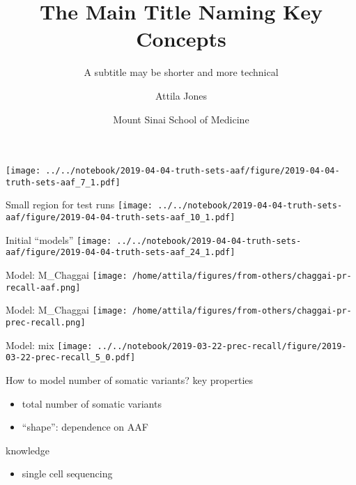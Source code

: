 \documentclass{beamer}
\title{The Main Title Naming Key Concepts}
\subtitle{A subtitle may be shorter and more technical}
\author{Attila Jones}
\date{Mount Sinai School of Medicine}
\begin{document}
\maketitle

\begin{frame}[plain]
\texttt{[image: ../../notebook/2019-04-04-truth-sets-aaf/figure/2019-04-04-truth-sets-aaf\_7\_1.pdf]}
\end{frame}

\begin{frame}{Small region for test runs}
\texttt{[image: ../../notebook/2019-04-04-truth-sets-aaf/figure/2019-04-04-truth-sets-aaf\_10\_1.pdf]}
\end{frame}

\begin{frame}[label=chaggais_model]{Initial ``models''}
\texttt{[image: ../../notebook/2019-04-04-truth-sets-aaf/figure/2019-04-04-truth-sets-aaf\_24\_1.pdf]}
\end{frame}

\begin{frame}{Model: M\_Chaggai\)}
\texttt{[image: /home/attila/figures/from-others/chaggai-pr-recall-aaf.png]}
\end{frame}

\begin{frame}{Model: M\_Chaggai\)}
\texttt{[image: /home/attila/figures/from-others/chaggai-pr-prec-recall.png]}
\end{frame}


\begin{frame}{Model: mix}
\texttt{[image: ../../notebook/2019-03-22-prec-recall/figure/2019-03-22-prec-recall\_5\_0.pdf]}
\end{frame}

\begin{frame}{How to model number of somatic variants?}
key properties
\begin{itemize}
\item total number of somatic variants
\item ``shape'': dependence on AAF 
\end{itemize}
\vfill
knowledge
\begin{itemize}
\item single cell sequencing
\end{itemize} 
\end{frame}
\end{document}
